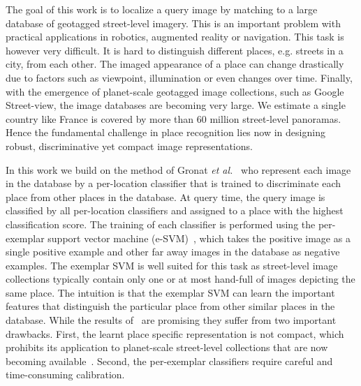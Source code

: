 \documentclass[table]{article} %
\begin{document}
The goal of this work is to localize a query image by matching to a large database of geotagged street-level imagery.
This is an important problem with practical applications in robotics, augmented reality or navigation. 
This task is however very difficult. It is hard to distinguish different places, e.g. streets in a city, from each other. The 
imaged appearance of a place can change drastically due to factors such as  viewpoint, illumination or even changes over time.
Finally, with the emergence of planet-scale geotagged image collections, such as Google Street-view, the image databases are becoming very large.   
We estimate a single country like France is covered by more than 60 million street-level panoramas. 
Hence the fundamental challenge in place recognition lies now in designing robust, discriminative yet compact image representations.

In this work we build on the method of Gronat {\it et al.}~\cite{Gronat13} who represent each image in the database by a per-location classifier
that is trained to discriminate each place from other places in the database. At query time, the query image is classified by all per-location classifiers and assigned to a place with the highest classification score. The training of each classifier is performed using the per-exemplar support vector machine (e-SVM)~\cite{Malisiewicz11}, which takes the positive image
as a single positive example and other far away images in the database as negative examples. 
The exemplar SVM is well suited for this task as street-level image collections typically contain only one or at most hand-full of images depicting the same place. The intuition is that the exemplar SVM can learn the important features that distinguish the particular place from other similar places  in the database.  While the results of~\cite{Gronat13} are promising they suffer from two important drawbacks. First, the learnt place specific representation is not compact, 
 which prohibits its application to planet-scale street-level collections that are now becoming available~\cite{Klinger13}. Second, the per-exemplar classifiers require careful and time-consuming calibration.
\end{document}
